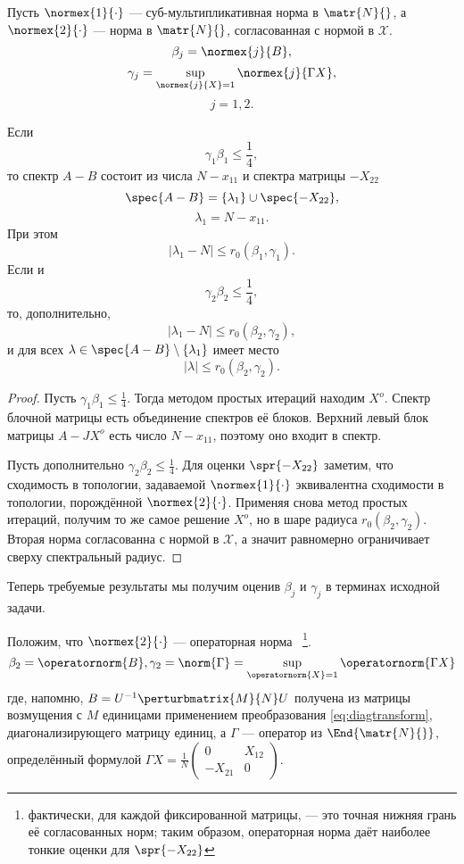 \begin{lemma}
    Пусть \( \normex{1}{\cdot} \) --- суб-мультипликативная норма в \( \matr{N}{} \),
    а \( \normex{2}{\cdot} \) --- норма в \( \matr{N}{} \), согласованная с нормой в \( \mathscr{X} \).
    \[ \beta_j = \normex{j}{B}, \]
    \[ \gamma_j = \sup_{\normex{j}{X}=1} \normex{j}{\Gamma X}, \]
    \[ j=1,2. \]

    Если
    \[ \gamma_1\beta_1 \leq \frac14, \]
    то спектр \( A - B \) состоит из числа \( N - x_{11} \)
    и спектра матрицы \( -X_{22} \)
    \[ \spec{A-B} = \{ \lambda_1 \} \cup \spec{-X_{22}}, \]
    \[ \lambda_1 = N - x_{11}.  \]
    При этом
    \[ \lvert \lambda_1 - N \rvert \leq r_0(\beta_1,\gamma_1). \]
    Если и
    \[ \gamma_2\beta_2 \leq \frac14, \]
    то, дополнительно,
    \[ \lvert \lambda_1 - N \rvert \leq r_0(\beta_2,\gamma_2), \]
    и для всех
    \( { \lambda\in\spec{A-B}\setminus\{\lambda_1\} } \) имеет место
    \[ \lvert\lambda\rvert \leq r_0(\beta_2,\gamma_2). \]
\end{lemma}
\begin{proof}
    Пусть \( \gamma_1\beta_1 \leq \frac14 \).
    Тогда методом простых итераций находим \( X^o \).
    Спектр блочной матрицы есть объединение спектров её блоков.
    Верхний левый блок матрицы \( A - JX^o \)
    есть число \( N - x_{11} \),
    поэтому оно входит в спектр.

    Пусть дополнительно \( \gamma_2\beta_2 \leq \frac14 \).
    Для оценки \( \spr{-X_{22}} \) заметим,
    что сходимость в топологии, задаваемой \( \normex{1}{\cdot} \)
    эквивалентна сходимости в топологии, порождённой \( \normex{2}{\cdot} \).
    Применяя снова метод простых итераций, получим то же самое решение \( X^o \),
    но в шаре радиуса \( r_0(\beta_2,\gamma_2) \).
    Вторая норма согласованна с нормой в \( \mathscr{X} \),
    а значит равномерно ограничивает сверху спектральный радиус.
\end{proof}

Теперь требуемые результаты мы получим оценив \( \beta_j \) и \( \gamma_j \)
в терминах исходной задачи.

Положим,
что \( \normex{2}{\cdot} \) --- операторная норма~
\footnote{фактически, для каждой фиксированной матрицы,
--- это точная нижняя грань её согласованных норм; таким образом,
операторная норма даёт наиболее тонкие оценки для \( \spr{-X_{22}} \) }.
\[ \beta_2 = \operatornorm{B}, \gamma_2 = \norm{\Gamma} = \sup_{\operatornorm{X}=1} \operatornorm{\Gamma X} \]
где, напомню, \( B = U^{-1} \perturbmatrix{M}{N} U \)
получена из матрицы возмущения с \( M \) единицами применением преобразования \eqref{eq:diagtransform},
диагонализирующего матрицу единиц,
а \( \Gamma \) --- оператор из \( \End{\matr{N}{}} \),
определённый формулой
\( \Gamma X = \frac1N \begin{pmatrix}0 & X_{12} \\ -X_{21} & 0\end{pmatrix} \).

